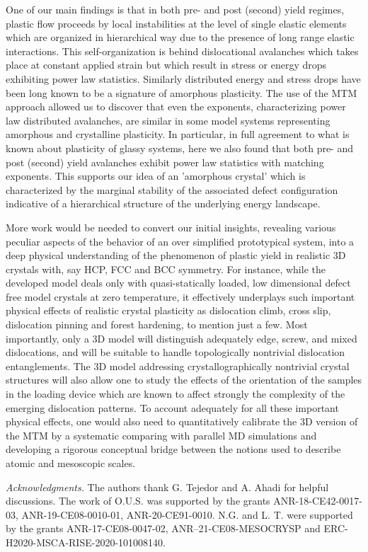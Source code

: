 \documentclass[aps,
superscriptaddress,notitlepage]{revtex4-1}
\begin{document}
One of our main findings is that   in both pre- and post (second) yield regimes, plastic  flow proceeds by local instabilities at the level of single elastic elements which  are organized  in   hierarchical  way due to the presence of long range  elastic interactions. This self-organization is behind   dislocational avalanches  which takes place at   constant applied strain but which result in  stress or energy drops exhibiting power law statistics. Similarly distributed energy and stress drops  have been long known  to be a signature of  amorphous plasticity. The use of the MTM approach allowed us  to  discover that even the exponents, characterizing power law distributed avalanches,  are similar in some model systems representing amorphous and crystalline plasticity. In particular, in full agreement  to what is known about plasticity of glassy systems, here  we also found  that both pre- and post (second) yield   avalanches exhibit power law statistics with  matching exponents. This supports our idea of an 'amorphous crystal'  which is characterized by the  marginal stability of the associated defect configuration   indicative of a   hierarchical  structure of the underlying energy landscape. 
  
 
  More work would be needed to convert our initial insights, revealing various peculiar aspects of the behavior  of an over simplified prototypical system, into a deep physical  understanding of the phenomenon of plastic yield  in  realistic 3D crystals with, say  HCP, FCC and BCC symmetry.  For instance, while the developed model deals only with  quasi-statically loaded,  low dimensional  defect free model crystals at zero  temperature,  it  effectively underplays  such important physical effects of  realistic crystal plasticity  as dislocation climb, cross slip, dislocation pinning and  forest  hardening,  to mention just a few. Most importantly, only a 3D model will distinguish adequately edge, screw, and mixed dislocations, and  will be suitable to handle topologically nontrivial  dislocation entanglements. The 3D model addressing crystallographically nontrivial  crystal structures will also allow one to study the effects of the orientation of the samples in the loading device which are known to affect strongly the complexity of the emerging dislocation patterns.  To account adequately for all these important physical effects,  one would also need to quantitatively calibrate the 3D version of the MTM by a systematic comparing  with parallel MD simulations and developing a rigorous conceptual bridge between the notions used to describe atomic and mesoscopic scales. 
 
 
\emph{ Acknowledgments. } The authors thank G. Tejedor and A. Ahadi for helpful discussions. The work of O.U.S. was supported  by  the grants ANR-18-CE42-0017-03, ANR-19-CE08-0010-01, ANR-20-CE91-0010. N.G. and L. T. were supported by the grants ANR-17-CE08-0047-02, ANR–21-CE08-MESOCRYSP and ERC-H2020-MSCA-RISE-2020-101008140.

%

\end{document}
